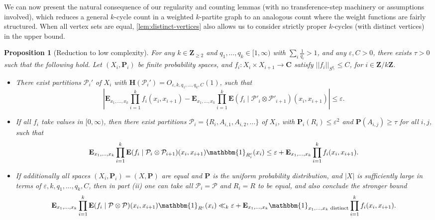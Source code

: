 \documentclass[reqno,11pt]{amsart}
\newtheorem{proposition}[theorem]{Proposition}
\theoremstyle{definition}
\theoremstyle{remark}
\numberwithin{equation}{section}
\newcommand{\Z}{\mathbf{Z}}
\newcommand{\C}{\mathbf{C}}
\renewcommand{\P}{\mathbf{P}}
\renewcommand{\H}{\mathbf{H}}
\newcommand{\E}{\mathbf{E}}
\newcommand{\mP}{\mathcal{P}}
\newcommand{\one}{\mathbbm{1}}
\newcommand{\eps}{\varepsilon}
\begin{document}
We can now present the natural consequence of our regularity and counting lemmas (with no transference-step machinery or assumptions involved), which reduces a general $k$-cycle count in a weighted $k$-partite graph to an analogous count where the weight functions are fairly structured. When all vertex sets are equal, \cref{lem:distinct-vertices} also allows us to consider strictly proper $k$-cycles (with distinct vertices) in the upper bound.


\begin{proposition}[Reduction to low complexity] \label{prop:reduction-to-structure}
For any $k \in \Z_{\ge 2}$ and $q_1, \ldots, q_k \in [1, \infty)$ with $\sum_i \frac{1}{q_i} > 1$, and any $\eps, C > 0$, there exists $\tau > 0$ such that the following hold. Let $(X_i, \P_i)$ be finite probability spaces, and $f_{i} : X_i \times X_{i+1} \to \C$ satisfy $||f_{i}||_{S^{q_i}} \le C$, for $i \in \Z/k\Z$.
\begin{itemize}
    \item[$(i)$.] There exist partitions $\mP_i'$ of $X_i$ with $\H(\mP_i') = O_{\eps,k,q_1, \ldots, q_k,C}(1)$, such that
    \[
        \left\vert \E_{x_1, \ldots, x_k} \prod_{i=1}^k f_{i}(x_i,x_{i+1})
        -
        \E_{x_1, \ldots, x_k} \prod_{i=1}^k \E(f_{i} \mid \mP'_i \otimes \mP'_{i+1})(x_i,x_{i+1}) 
        \right\vert
        \le
        \eps.
    \]
    \item[$(ii)$.] If all $f_{i}$ take values in $[0, \infty)$, then there exist partitions $\mP_i = \{R_i, A_{i,1}, A_{i,2}, \ldots\}$ of $X_i$, with $\P_i(R_i) \le \eps^2$ and $\P(A_{i,j}) \ge \tau$ for all $i, j$, such that
    \[
        \E_{x_1, \ldots, x_k} \prod_{i=1}^k \E(f_{i} \mid \mP_i \otimes \mP_{i+1})(x_i, x_{i+1})\one_{R_i^c}(x_i) \le \eps + \E_{x_1, \ldots, x_k} \prod_{i=1}^k f_{i}(x_i,x_{i+1}).
    \]
    \item[$(iii)$.] If additionally all spaces $(X_i, \P_i) = (X, \P)$ are equal and $\P$ is the uniform probability distribution, and $|X|$ is sufficiently large in terms of $\eps,k,q_1, \ldots, q_k, C$, then in part (ii) one can take all $\mP_i = \mP$ and $R_i = R$ to be equal, and also conclude the stronger bound
    \[
        \E_{x_1, \ldots, x_k} \prod_{i=1}^k \E(f_{i} \mid \mP \otimes \mP)(x_i,x_{i+1}) \one_{R^c}(x_i) 
        \ll_k
        \eps + \E_{x_1, \ldots, x_k} \one_{x_1,\ldots,x_k \textnormal{ distinct}}\prod_{i=1}^k f_{i}(x_i,x_{i+1}).
    \]
\end{itemize}
\end{proposition}
\end{document}
